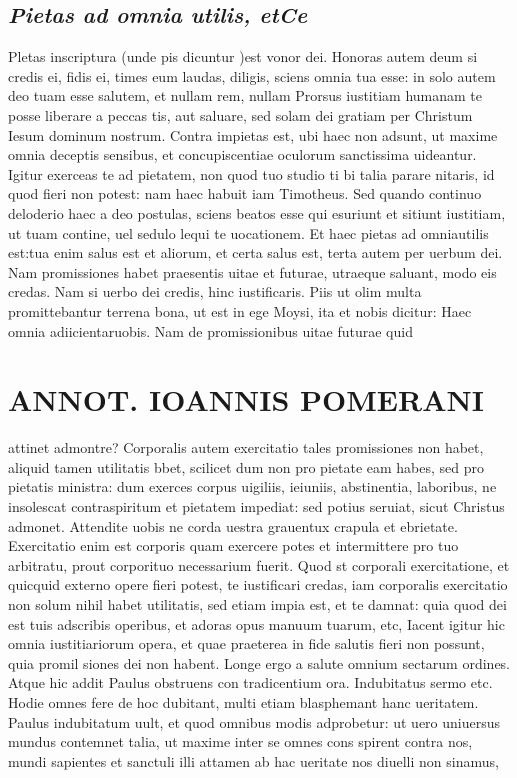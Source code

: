 \documentclass{article}
\begin{document}
\begin{pages}
\subsection*{\textit{Pietas ad omnia utilis, etCe }}\pstart Pletas inscriptura (unde pis dicuntur )est vonor dei. Honoras autem deum si credis ei, fidis ei, times eum laudas, diligis, sciens omnia tua esse: in solo autem deo tuam esse salutem, et nullam rem, nullam Prorsus iustitiam humanam te posse liberare a peccas tis, aut saluare, sed solam dei gratiam per Christum Iesum dominum nostrum. Contra impietas est, ubi haec non adsunt, ut maxime omnia deceptis sensibus, et concupiscentiae oculorum sanctissima uideantur. Igitur exerceas te ad pietatem, non quod tuo studio ti bi talia parare nitaris, id quod fieri non potest: nam haec habuit iam Timotheus. Sed quando continuo deloderio haec a deo postulas, sciens beatos esse qui esuriunt et sitiunt iustitiam, ut tuam contine, uel sedulo lequi te uocationem. Et haec pietas ad omniautilis est:tua enim salus est et aliorum, et certa salus est, terta autem per uerbum dei. Nam promissiones habet praesentis uitae et futurae, utraeque saluant, modo eis credas. Nam si uerbo dei credis, hinc iustificaris. Piis ut olim multa promittebantur terrena bona, ut est in ege Moysi, ita et nobis dicitur: Haec omnia adiicientaruobis. Nam de promissionibus uitae futurae quid  \pend
\section*{ANNOT. IOANNIS POMERANI }\pstart attinet admontre? Corporalis autem exercitatio tales promissiones non habet, aliquid tamen utilitatis bbet, scilicet dum non pro pietate eam habes, sed pro pietatis ministra: dum exerces corpus uigiliis, ieiuniis, abstinentia, laboribus, ne insolescat contraspiritum et pietatem impediat: sed potius seruiat, sicut Christus admonet. Attendite uobis ne corda uestra grauentux crapula et ebrietate. Exercitatio enim est corporis quam exercere potes et intermittere pro tuo arbitratu, prout corporituo necessarium fuerit. Quod st corporali exercitatione, et quicquid externo opere fieri potest, te iustificari credas, iam corporalis exercitatio non solum nihil habet utilitatis, sed etiam impia est, et te damnat: quia quod dei est tuis adscribis operibus, et adoras opus manuum tuarum, etc, Iacent igitur hic omnia iustitiariorum opera, et quae praeterea in fide salutis fieri non possunt, quia promil siones dei non habent. Longe ergo a salute omnium sectarum ordines. Atque hic addit Paulus obstruens con tradicentium ora. Indubitatus sermo etc. Hodie omnes fere de hoc dubitant, multi etiam blasphemant hanc ueritatem. Paulus indubitatum uult, et quod omnibus modis adprobetur: ut uero uniuersus mundus contemnet talia, ut maxime inter se omnes cons spirent contra nos, mundi sapientes et sanctuli illi attamen ab hac ueritate nos diuelli non sinamus,  \pend

\end{pages}
\end{document}
